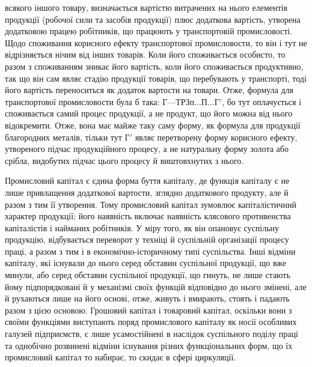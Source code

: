 \parcont{}  %
всякого іншого товару, визначається вартістю витрачених на нього елементів
продукції (робочої сили та засобів продукції) плюс додаткова
вартість, утворена додатковою працею робітників, що працюють у транспортовій
промисловості. Щодо споживання корисного ефекту транспортової
промисловости, то він і тут не відрізняється нічим від інших товарів.
Коли його споживається особисто, то разом з споживанням зникає його
вартість, коли його споживається продуктивно, так що він сам являє стадію
продукції товарів, що перебувають у транспорті, тоді його вартість
переноситься як додаток вартости на товари. Отже, формула для транспортової
промисловости була б така: $Г — Т Р Зп... П... Г'$, бо тут оплачується і
споживається самий процес продукції, а не продукт, що його можна від
нього відокремити. Отже, вона має майже таку саму форму, як формула для
продукції благородних металів, тільки тут $Г'$ являє перетворену форму
корисного ефекту, утвореного підчас продукційного процесу, а не
натуральну форму золота або срібла, видобутих підчас цього процесу й
виштовхнутих з нього.

Промисловий капітал є єдина форма буття капіталу, де функція
капіталу є не лише привлащення додаткової вартости, зглядно додаткового
продукту, але й разом з тим її утворення. Тому промисловий
капітал зумовлює капіталістичний характер продукції; його наявність
включає наявність клясового противенства капіталістів і найманих робітників.
У міру того, як він опановує суспільну продукцію, відбувається
переворот у техніці й суспільній організації процесу праці, а
разом з тим і в економічно-історичному типі суспільства. Інші відміни
капіталу, які існували до нього серед обставин суспільної продукції, що
вже минули, або серед обставин суспільної продукції, що гинуть, не
лише стають йому підпорядковані й у механізмі своїх функцій відповідно
до нього змінені, але й рухаються лише на його основі, отже, живуть
і вмирають, стоять і падають разом з цією основою. Грошовий
капітал і товаровий капітал, оскільки вони з своїми функціями виступають
поряд промислового капіталу як носії особливих галузей підприємств,
є лише усамостійнені в наслідок суспільного поділу праці
та однобічно розвинені відміни існування різних функціональних форм,
що їх промисловий капітал то набирає, то скидає в сфері циркуляції.

